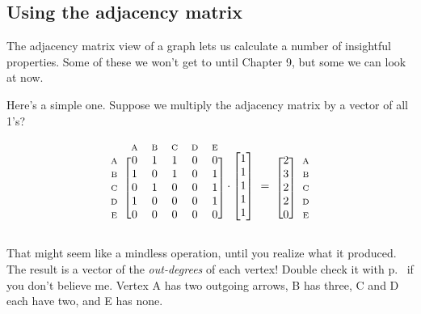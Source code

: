 \subsection{Using the adjacency matrix}

The adjacency matrix view of a graph lets us calculate a number of insightful
properties. Some of these we won't get to until Chapter 9, but some we can look
at now.


Here's a simple one. Suppose we multiply the adjacency matrix by a vector of
all 1's?

\[
\begin{blockarray}{cccccc}
& {\scriptsize\textrm{A}} & {\scriptsize\textrm{B}} & {\scriptsize\textrm{C}} & {\scriptsize\textrm{D}} & {\scriptsize\textrm{E}} \\
\begin{block}{c[ccccc]}
{\scriptsize\textrm{A}} & 0 & 1 & 1 & 0 & 0 \\
{\scriptsize\textrm{B}} & 1 & 0 & 1 & 0 & 1 \\
{\scriptsize\textrm{C}} & 0 & 1 & 0 & 0 & 1 \\
{\scriptsize\textrm{D}} & 1 & 0 & 0 & 0 & 1 \\
{\scriptsize\textrm{E}} & 0 & 0 & 0 & 0 & 0 \\
\end{block}
\end{blockarray} \cdot
\begin{bmatrix}
1 \\ 1 \\ 1 \\ 1 \\ 1 \\
\end{bmatrix} \ = \
\begin{blockarray}{cc}
\\
\begin{block}{[c]c}
2 & {\scriptsize\textrm{A}} \\
3 & {\scriptsize\textrm{B}} \\
2 & {\scriptsize\textrm{C}} \\
2 & {\scriptsize\textrm{D}} \\
0 & {\scriptsize\textrm{E}} \\
\end{block}
\end{blockarray}
\]


That might seem like a mindless operation, until you realize what it produced.
The result is a vector of the \textit{out-degrees} of each vertex! Double
check it with p.~\pageref{fig:directedGraph} if you don't believe me. Vertex A
has two outgoing arrows, B has three, C and D each have two, and E has none.

